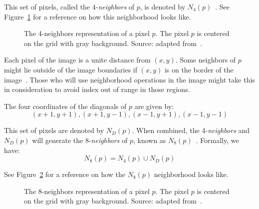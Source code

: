 This set of pixels, called the 4-\textit{neighbors} of $p$, is denoted by $N_4(p)$~\citep{gonzalez:02}. See Figure~\ref{fig:n4-neighbors} for a reference on how this neighborhood looks like.

\begin{figure}[ht]
    \centering

    \caption[The 4-neighbors representation of a pixel $p$]{The 4-neighbors representation of a pixel $p$. The pixel $p$ is centered on the grid with gray background. Source: adapted from~\citet{pedrini:08}.}
    \label{fig:n4-neighbors}
\end{figure}

Each pixel of the image is a unite distance from $(x, y)$. Some neighbors of $p$ might lie outside of the image boundaries if $(x, y)$ is on the border of the image~\citep{gonzalez:02}. Those who will use neighborhood operations in the image might take this in consideration to avoid index out of range in those regions.

The four coordinates of the diagonals of $p$ are given by:
\begin{equation*}
    (x + 1, y + 1), (x + 1, y - 1), (x - 1, y + 1), (x - 1, y - 1)
    \label{eq:nd_neighbors}
\end{equation*}

This set of pixels are denoted by $N_D(p)$. When combined, the 4-\textit{neighbors} and $N_D(p)$ will generate the 8-\textit{neighbors} of $p$, known as $N_8(p)$~\citep{gonzalez:02}. Formally, we have:
\begin{equation*}
    N_8(p) = N_4(p) \cup N_D(p)
    \label{eq:n8_neighbors}
\end{equation*}

See Figure~\ref{fig:n8-neighbors} for a reference on how the $N_8(p)$ neighborhood looks like.

\begin{figure}[ht]
    \centering

    \caption[The 8-neighbors representation of a pixel $p$]{The 8-neighbors representation of a pixel $p$. The pixel $p$ is centered on the grid with gray background. Source: adapted from~\citet{pedrini:08}.}
    \label{fig:n8-neighbors}
\end{figure}

